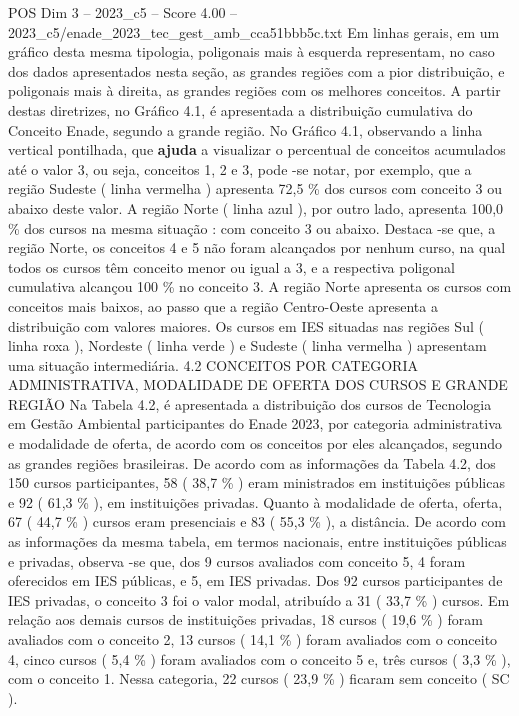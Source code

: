 \begin{textsample}{POS Dim 3 – 2023\_c5 – Score 4.00 – 2023\_c5/enade\_2023\_tec\_gest\_amb\_cca51bbb5c.txt}
Em linhas gerais, em um gráfico desta mesma tipologia, poligonais mais à esquerda representam, no caso dos dados apresentados nesta seção, as grandes regiões com a pior distribuição, e poligonais mais à direita, as grandes regiões com os melhores conceitos.
A partir destas diretrizes, no Gráfico 4.1, é apresentada a distribuição cumulativa do Conceito Enade, segundo a grande região.
No Gráfico 4.1, observando a linha vertical pontilhada, que \textbf{ajuda} a visualizar o percentual de conceitos acumulados até o valor 3, ou seja, conceitos 1, 2 e 3, pode -se notar, por exemplo, que a região Sudeste ( linha vermelha ) apresenta 72,5 \% dos cursos com conceito 3 ou abaixo deste valor.
A região Norte ( linha azul ), por outro lado, apresenta 100,0 \% dos cursos na mesma situação : com conceito 3 ou abaixo.
Destaca -se que, a região Norte, os conceitos 4 e 5 não foram alcançados por nenhum curso, na qual todos os cursos têm conceito menor ou igual a 3, e a respectiva poligonal cumulativa alcançou 100 \% no conceito 3.
A região Norte apresenta os cursos com conceitos mais baixos, ao passo que a região Centro-Oeste apresenta a distribuição com valores maiores.
Os cursos em IES situadas nas regiões Sul ( linha roxa ), Nordeste ( linha verde ) e Sudeste ( linha vermelha ) apresentam uma situação intermediária. 4.2 CONCEITOS POR CATEGORIA ADMINISTRATIVA, MODALIDADE DE OFERTA DOS CURSOS E GRANDE REGIÃO Na Tabela 4.2, é apresentada a distribuição dos cursos de Tecnologia em Gestão Ambiental participantes do Enade 2023, por categoria administrativa e modalidade de oferta, de acordo com os conceitos por eles alcançados, segundo as grandes regiões brasileiras.
De acordo com as informações da Tabela 4.2, dos 150 cursos participantes, 58 ( 38,7 \% ) eram ministrados em instituições públicas e 92 ( 61,3 \% ), em instituições privadas.
Quanto à modalidade de oferta, oferta, 67 ( 44,7 \% ) cursos eram presenciais e 83 ( 55,3 \% ), a distância.
De acordo com as informações da mesma tabela, em termos nacionais, entre instituições públicas e privadas, observa -se que, dos 9 cursos avaliados com conceito 5, 4 foram oferecidos em IES públicas, e 5, em IES privadas.
Dos 92 cursos participantes de IES privadas, o conceito 3 foi o valor modal, atribuído a 31 ( 33,7 \% ) cursos.
Em relação aos demais cursos de instituições privadas, 18 cursos ( 19,6 \% ) foram avaliados com o conceito 2, 13 cursos ( 14,1 \% ) foram avaliados com o conceito 4, cinco cursos ( 5,4 \% ) foram avaliados com o conceito 5 e, três cursos ( 3,3 \% ), com o conceito 1.
Nessa categoria, 22 cursos ( 23,9 \% ) ficaram sem conceito ( SC ).

\end{textsample}
